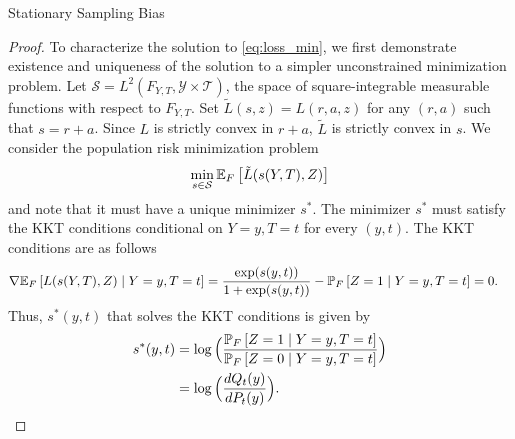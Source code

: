 \documentclass{article}
\theoremstyle{definition}
\theoremstyle{plain}
\theoremstyle{remark}
\begin{document}
\begin{section}{Stationary Sampling Bias}
\begin{proof}
To characterize the solution to \eqref{eq:loss_min}, we first demonstrate existence and uniqueness of the solution to a simpler unconstrained minimization problem.  Let $\mathcal{S} = L^{2}(F_{Y,T}, \mathcal{Y} \times \mathcal{T})$, the space of square-integrable measurable functions with respect to $F_{Y, T}$. Set $\tilde{L}(s, z) = L(r, a, z)$ for any $(r, a)$ such that $s = r+ a$. Since $L$ is strictly convex in $r + a$, $\tilde{L}$ is strictly convex in $s$. We consider the population risk minimization problem 
\begin{equation} \label{eq:simple} \min_{s \in \mathcal{S}} \EE[F]{\tilde{L}(s(Y, T), Z)} \end{equation}
and note that it must have a unique minimizer $s^{*}$. The minimizer $s^{*}$ must satisfy the KKT conditions conditional on $Y=y, T=t$ for every $(y, t).$ The KKT conditions are as follows
\begin{align*}
\nabla \EE[F]{L(s(Y, T), Z) \mid Y=y, T=t} &= \frac{\exp(s(y,t))}{ 1 + \exp(s(y,t))} - \PP[F]{Z = 1 \mid Y=y, T=t} = 0.
\end{align*} 
Thus, $s^{*}(y, t)$ that solves the KKT conditions is given by
\begin{align*} 
s^{*}(y, t) &= \log\Big(\frac{\PP[F]{Z = 1 \mid Y=y, T=t}}{\PP[F]{Z= 0 \mid Y= y, T=t}} \Big) \\
&= \log \Big( \frac{dQ_{t}(y)}{dP_{t}(y)} \Big).
\end{align*}


\end{proof}
\end{section}
\end{document}
